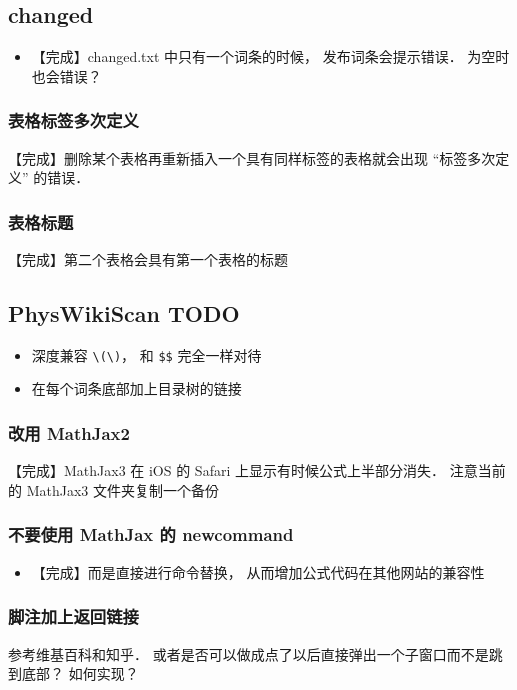 \subsection{changed}
\begin{itemize}
\item 【完成】changed.txt 中只有一个词条的时候， 发布词条会提示错误． 为空时也会错误？
\end{itemize}

\subsubsection{表格标签多次定义}
【完成】删除某个表格再重新插入一个具有同样标签的表格就会出现 “标签多次定义” 的错误．

\subsubsection{表格标题}
【完成】第二个表格会具有第一个表格的标题

\subsection{PhysWikiScan TODO}
\begin{itemize}
\item 深度兼容 \lstinline|\(\)|， 和 \lstinline|$$| 完全一样对待

\item 在每个词条底部加上目录树的链接
\end{itemize}

\subsubsection{改用 MathJax2}
【完成】MathJax3 在 iOS 的 Safari 上显示有时候公式上半部分消失． 注意当前的 MathJax3 文件夹复制一个备份

\subsubsection{不要使用 MathJax 的 newcommand}
\begin{itemize}
\item 【完成】而是直接进行命令替换， 从而增加公式代码在其他网站的兼容性
\end{itemize}

\subsubsection{脚注加上返回链接}
参考维基百科和知乎． 或者是否可以做成点了以后直接弹出一个子窗口而不是跳到底部？ 如何实现？

